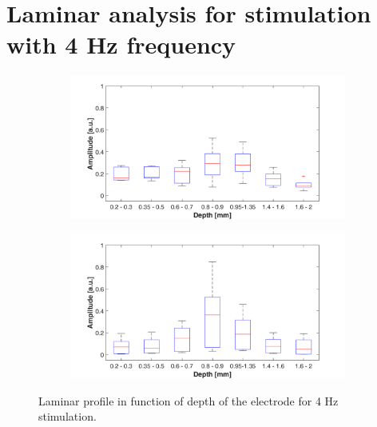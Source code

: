 \documentclass{pracalicmgr}
\begin{document}
\section{Laminar analysis for stimulation with 4 Hz frequency} 
   	\begin{figure}[H]
	\begin{subfigure}{.5\textwidth}
		\centering
		\includegraphics[width=1.\linewidth]{profile_4Hz_wid.png}
		\caption{}
		\label{rys:profil_4Hz_wid1}
	\end{subfigure}%
	\begin{subfigure}{.5\textwidth}
		\centering
		\includegraphics[width=1.\linewidth]{profile_4Hz_wid2.png}
		\caption{}
		\label{rys:profil_4Hz_wid2}
	\end{subfigure}
	
	\caption{Laminar profile in function of depth of the electrode for 4 Hz stimulation.}
	\label{rys:profil_4Hz_wid}
\end{figure}
\end{document}
